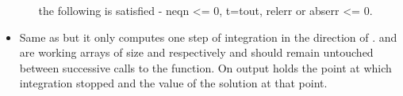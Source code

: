 \begin{itemize}
\begin{itemize}
   the following is satisfied -   neqn <= 0, t=tout,  relerr or abserr <= 0.
  \end{itemize}
\item {} 
  \sshortdescribe Same as  but it only computes one step
  of integration in the direction of .  and  are
  working arrays of size  and  respectively and should
  remain untouched between successive calls to the function. 
  On output  holds the point at which integration stopped and  the
  value of the solution at that point.
\end{itemize}


